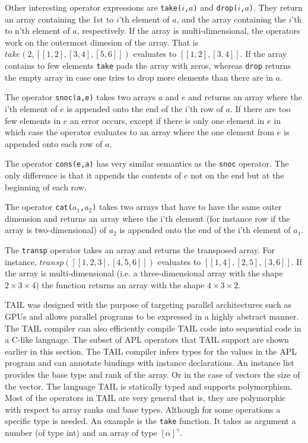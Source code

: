 \documentclass[11pt]{article}
\begin{document}
Other interesting operator expressions are {\tt take($i$,$a$)} and {\tt drop($i$,$a$)}.
They return an array containing the 1st to $i$'th element of $a$,
and the array containing the $i$'th to n'th element of $a$, respectively.
If the array is multi-dimensional, the operators work on the outermost dimesion of the array. That is $take(2,[[1,2],[3,4],[5,6]])$ evaluates to $[[1,2],[3,4]]$.
If the array contains to few elements {\tt take} pads the array with zeros,
whereas {\tt drop} returns the empty array in case one tries to drop more elements than there are in $a$. 

The operator {\tt snoc(a,e)} takes two arrays $a$ and $e$ and returns an array where the i'th element of $e$ is appended onto the end of the i'th row of $a$.
If there are too few elements in $e$ an error occurs,
except if there is only one element in $e$ in which case the operator evaluates to an array where the one element from $e$
is appended onto each row of $a$.

The operator {\tt cons(e,a)} has very similar semantics as the {\tt snoc} operator.
The only difference is that it appends the contents of $e$ not on the end but at the beginning of each row.

The operator {\tt cat($a_1$,$a_2$)} takes two arrays that have to have the same outer dimension and returns an array where the i'th element (for instance row if the array is two-dimensional) of $a_2$ is appended onto the end of the i'th element of $a_1$.

The {\tt transp} operator takes an array and returns the transposed array. For instance,
 $transp([[1,2,3],[4,5,6]])$ evaluates to $[[1,4],[2,5],[3,6]]$.
If the array is multi-dimensional (i.e. a three-dimensional array with the shape $2\times3\times4$) the function returns an array with the shape $4\times3\times2$.

TAIL was designed with the purpose of targeting parallel architectures such as GPUs and allows parallel programs to be
expressed in a highly abstract manner.
The TAIL compiler can also efficiently compile TAIL code into sequential code in a C-like language.
The subset of APL operators that TAIL support are shown earlier in this section.
The TAIL compiler infers types for the values in the APL program and can annotate bindings with
instance declarations. An instance list provides the base type and rank of the array. Or in
the case of vectors the size of the vector.
The language TAIL is statically typed and supports polymorphism. 
Most of the operators in TAIL are very general that is, they are polymorphic with respect to array ranks and base types.
Although for some operations a specific type is needed.
An example is the {\tt take} function. It takes as argument a number (of type int) and an array of type $[\alpha]^\gamma$.
\end{document}
